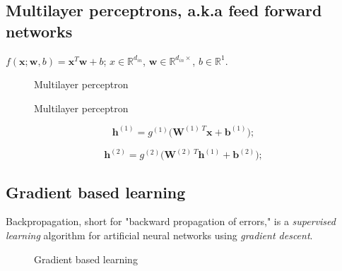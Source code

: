 %    


\subsection{Multilayer perceptrons, a.k.a feed forward networks}

$f(\mathbf{x};\mathbf{w}, b)=\mathbf{x}^T\mathbf{w}+b$; $x\in\mathbb{R}^{d_{in}}$, $\mathbf{w}\in\mathbb{R}^{d_{in}\times}$, $b\in\mathbb{R}^1$.

\begin{figure}
    \centering
    
    \caption{Multilayer perceptron}
    \label{fig:mlp}
\end{figure}


\begin{figure}
    \centering
    
    \caption{Multilayer perceptron}
    \label{fig:mlp-vec}
\end{figure}


\begin{equation}
    \mathbf{h}^{(1)} = g^{(1)} \bigg(\mathbf{W}^{{(1)}\;T}\mathbf{x} + \mathbf{b}^{(1)}\bigg);
\end{equation}

\begin{equation}
    \mathbf{h}^{(2)} = g^{(2)} \bigg(\mathbf{W}^{{(2)}\;T}\mathbf{h}^{(1)} + \mathbf{b}^{(2)}\bigg);
\end{equation}

\subsection{Gradient based learning}

Backpropagation, short for "backward propagation of errors," is a
\textit{supervised learning} algorithm for artificial neural networks using
\textit{gradient descent}.

\begin{figure}[htp]
    \centering
    
    \caption{Gradient based learning}
    \label{fig:gradient-descent}
\end{figure}


